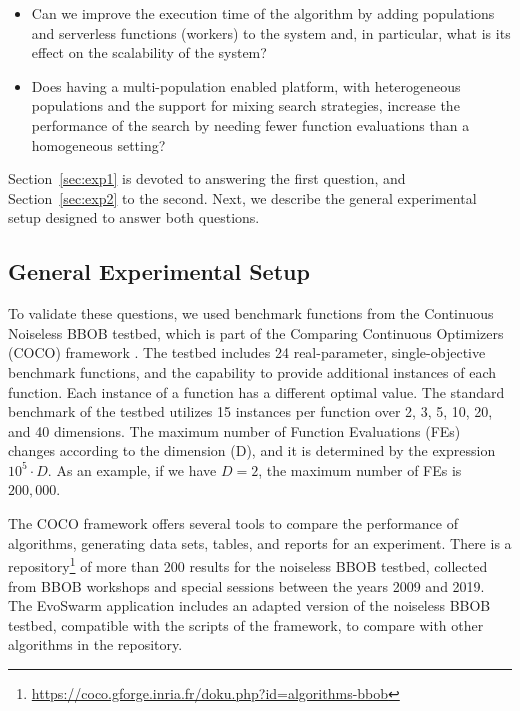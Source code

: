 \documentclass[review]{elsarticle}
\begin{document}
\begin{itemize}
\item Can we improve the execution time of the algorithm by adding populations
 and serverless functions (workers)  to the system and, in particular,
 what is its effect on the scalability of the system? %
 
\item Does having a multi-population enabled platform, with heterogeneous populations and
the support for mixing search strategies,  increase the performance of the
search by needing fewer function evaluations than a homogeneous setting? 

\end{itemize}

Section~\ref{sec:exp1} is devoted to answering the first question, and Section~\ref{sec:exp2} to the second.
Next, we describe the general experimental setup designed to answer
both questions.

\subsection{General Experimental Setup} 
\label{sec:general-setup} 

To validate these questions, we used benchmark functions from the Continuous
Noiseless BBOB testbed, which is part of the Comparing Continuous Optimizers
(COCO) framework \cite{hansen2016coco}. The testbed includes 24 real-parameter,
single-objective benchmark functions, and the capability to provide additional
instances of each function. Each instance of a function has a different optimal
value. The standard benchmark of the testbed utilizes 15 instances per function
over 2, 3, 5, 10, 20, and 40 dimensions. The maximum number of Function
Evaluations (FEs) changes according to the dimension (D), and it is determined
by the expression $10^5 \cdot D$. As an example, if we have $D = 2$, the
maximum number of FEs is $200,000$.

The COCO framework offers several tools to compare the performance of
algorithms, generating data sets, tables, and reports for an experiment. There
is a repository\footnote{\url{https://coco.gforge.inria.fr/doku.php?id=algorithms-bbob}} 
of more than 200 results for the noiseless BBOB testbed, collected from 
BBOB workshops and special sessions between the years 2009 and 2019. The
EvoSwarm application includes an adapted version of the noiseless BBOB testbed,
compatible with the scripts of the framework, to compare with other algorithms
in the repository.
\end{document}

